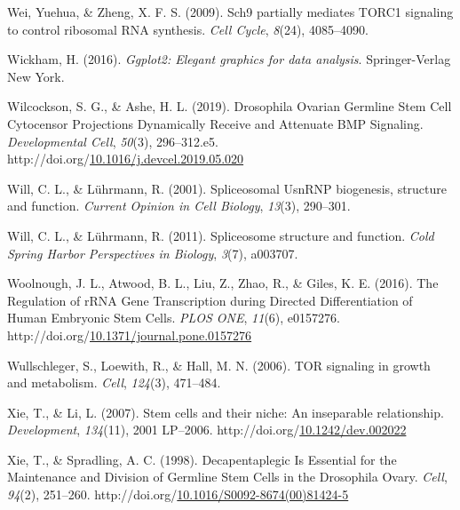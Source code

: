 \documentclass[12pt,oneside]{reedthesis}
\newlength{\cslhangindent}
\newenvironment{CSLReferences}[2] %
 {%
  \setlength{\parindent}{0pt}
  \ifodd #1 \everypar{\setlength{\hangindent}{\cslhangindent}}\ignorespaces\fi
  \ifnum #2 > 0
  \setlength{\parskip}{#2\baselineskip}
  \fi
 }%
 {}
\begin{document}
\begin{CSLReferences}{1}{0}
\leavevmode{}%
Wei, Yuehua, \& Zheng, X. F. S. (2009). Sch9 partially mediates {TORC1} signaling to control ribosomal {RNA} synthesis. \emph{Cell Cycle}, \emph{8}(24), 4085--4090.

\leavevmode{}%
Wickham, H. (2016). \emph{Ggplot2: {Elegant} graphics for data analysis}. {Springer-Verlag New York}.

\leavevmode{}%
Wilcockson, S. G., \& Ashe, H. L. (2019). Drosophila {Ovarian Germline Stem Cell Cytocensor Projections Dynamically Receive} and {Attenuate BMP Signaling}. \emph{Developmental Cell}, \emph{50}(3), 296--312.e5. http://doi.org/\href{https://doi.org/10.1016/j.devcel.2019.05.020}{10.1016/j.devcel.2019.05.020}

\leavevmode{}%
Will, C. L., \& Lührmann, R. (2001). Spliceosomal {UsnRNP} biogenesis, structure and function. \emph{Current Opinion in Cell Biology}, \emph{13}(3), 290--301.

\leavevmode{}%
Will, C. L., \& Lührmann, R. (2011). Spliceosome structure and function. \emph{Cold Spring Harbor Perspectives in Biology}, \emph{3}(7), a003707.

\leavevmode{}%
Woolnough, J. L., Atwood, B. L., Liu, Z., Zhao, R., \& Giles, K. E. (2016). The {Regulation} of {rRNA Gene Transcription} during {Directed Differentiation} of {Human Embryonic Stem Cells}. \emph{PLOS ONE}, \emph{11}(6), e0157276. http://doi.org/\href{https://doi.org/10.1371/journal.pone.0157276}{10.1371/journal.pone.0157276}

\leavevmode{}%
Wullschleger, S., Loewith, R., \& Hall, M. N. (2006). {TOR} signaling in growth and metabolism. \emph{Cell}, \emph{124}(3), 471--484.

\leavevmode{}%
Xie, T., \& Li, L. (2007). Stem cells and their niche: An inseparable relationship. \emph{Development}, \emph{134}(11), 2001 LP--2006. http://doi.org/\href{https://doi.org/10.1242/dev.002022}{10.1242/dev.002022}

\leavevmode{}%
Xie, T., \& Spradling, A. C. (1998). Decapentaplegic {Is Essential} for the {Maintenance} and {Division} of {Germline Stem Cells} in the {Drosophila Ovary}. \emph{Cell}, \emph{94}(2), 251--260. http://doi.org/\href{https://doi.org/10.1016/S0092-8674(00)81424-5}{10.1016/S0092-8674(00)81424-5}


\end{CSLReferences}
\end{document}
